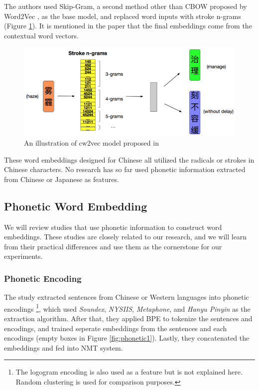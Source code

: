 The authors used Skip-Gram, a second method other than CBOW proposed by Word2Vec \cite{mikolov2013distributed}, as the base model, and replaced word inputs with stroke n-grams (Figure \ref{fig:cw2vec2}). It is mentioned in the paper that the final embeddings come from the contextual word vectors.

\begin{figure}[h]
	\centering
	\includegraphics[scale=0.6]{../images/cw2vec_illustration2.png}
	\caption{An illustration of cw2vec model proposed in \cite{cao2018cw2vec}}
	\label{fig:cw2vec2}
\end{figure}

These word embeddings designed for Chinese all utilized the radicals or strokes in Chinese characters. No research has so far used phonetic information extracted from Chinese or Japanese as features.

\subsection{Phonetic Word Embedding} \label{sec:rw_pwe}

We will review studies that use phonetic information to construct word embeddings. These studies are closely related to our research, and we will learn from their practical differences and use them as the cornerstone for our experiments.

\subsubsection{Phonetic Encoding}

The study \cite{khan2019diversity} extracted sentences from Chinese or Western languages into phonetic encodings \footnote{The logogram encoding is also used as a feature but is not explained here. Random clustering is used for comparison purposes.}, which used \textit{Soundex}, \textit{NYSIIS}, \textit{Metaphone}, and \textit{Hanyu Pinyin} as the extraction algorithm. After that, they applied BPE \cite{sennrich_neural_2016} to tokenize the sentences and encodings, and trained seperate embeddings from the sentences and each encodings (empty boxes in Figure \ref{fig:phonetic1}). Lastly, they concatenated the embeddings and fed into NMT system. 

